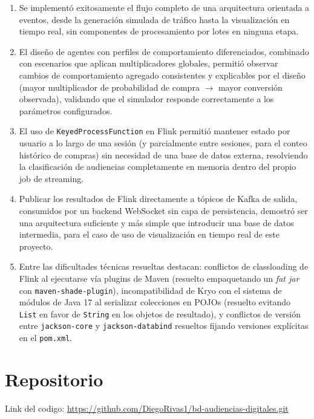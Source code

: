 \documentclass[11pt,a4paper]{article}
\begin{document}
\begin{enumerate}
\item Se implementó exitosamente el flujo completo de una arquitectura
orientada a eventos, desde la generación simulada de tráfico hasta la
visualización en tiempo real, sin componentes de procesamiento por
lotes en ninguna etapa.

\item El diseño de agentes con perfiles de comportamiento diferenciados,
combinado con escenarios que aplican multiplicadores globales, permitió
observar cambios de comportamiento agregado consistentes y explicables
por el diseño (mayor multiplicador de probabilidad de compra
$\rightarrow$ mayor conversión observada), validando que el simulador
responde correctamente a los parámetros configurados.

\item El uso de \texttt{KeyedProcessFunction} en Flink permitió mantener
estado por usuario a lo largo de una sesión (y parcialmente entre
sesiones, para el conteo histórico de compras) sin necesidad de una base
de datos externa, resolviendo la clasificación de audiencias
completamente en memoria dentro del propio job de streaming.

\item Publicar los resultados de Flink directamente a tópicos de Kafka
de salida, consumidos por un backend WebSocket sin capa de persistencia,
demostró ser una arquitectura suficiente y más simple que introducir una
base de datos intermedia, para el caso de uso de visualización en tiempo
real de este proyecto.

\item Entre las dificultades técnicas resueltas destacan: conflictos de
classloading de Flink al ejecutarse vía plugins de Maven (resuelto
empaquetando un \emph{fat jar} con \texttt{maven-shade-plugin}),
incompatibilidad de Kryo con el sistema de módulos de Java 17 al
serializar colecciones en POJOs (resuelto evitando \texttt{List} en
favor de \texttt{String} en los objetos de resultado), y conflictos de
versión entre \texttt{jackson-core} y \texttt{jackson-databind}
resueltos fijando versiones explícitas en el \texttt{pom.xml}.
\end{enumerate}

%
\section{Repositorio}
Link del codigo: \url{https://github.com/DiegoRivas1/bd-audiencias-digitales.git}
%
\end{document}
